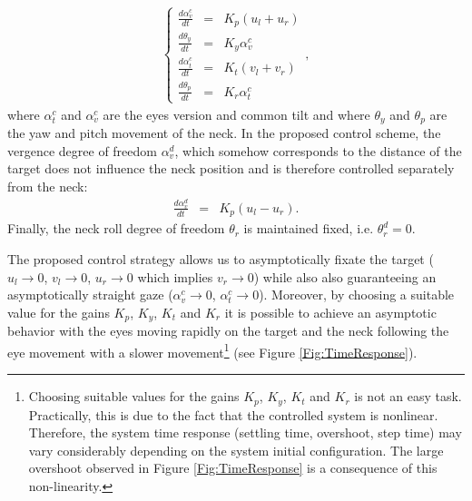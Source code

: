 \begin{eqnarray} \label{Eq:HeadEyeControl}
\left\{ \begin{matrix}
\frac{d \alpha_v^c}{ d t} &=&   K_p (u_l + u_r)\\
\frac{d \theta_y}{ d t} &=&   K_y \alpha_v^c \\
\frac{d \alpha_t^c} {d t} &=&   K_t (v_l + v_r)\\
\frac{d \theta_p} {d t} &=&   K_r \alpha_t^c
\end{matrix} \right.,
\end{eqnarray}
where $\alpha_t^c$ and $\alpha_v^c$ are the eyes version and common tilt and where $\theta_y$ and $\theta_p$ are the yaw and pitch movement of the neck. In the proposed control scheme, the vergence degree of freedom $\alpha_v^d$, which somehow corresponds to the distance of the target does not influence the neck position and is therefore controlled separately from the neck:
\begin{eqnarray} 
\frac{d \alpha_v^d}{ d t} &=&   K_p (u_l - u_r).
\end{eqnarray}
Finally, the neck roll degree of freedom $\theta_r$ is maintained fixed, i.e. $\theta_r^d=0$.

The proposed control strategy allows us to asymptotically fixate the target ($u_l \rightarrow 0$, $v_l \rightarrow 0$, $u_r \rightarrow 0$ which implies $v_r \rightarrow 0$) while also also guaranteeing an asymptotically  straight gaze ($\alpha_v^c \rightarrow 0$, $\alpha_t^c \rightarrow 0$). Moreover, by choosing a suitable value for the gains $K_p$, $K_y$, $K_t$ and $K_r$ it is possible to achieve an asymptotic behavior with the eyes moving rapidly on the target and the neck following the eye movement with a slower movement\footnote{\samepage Choosing suitable values for the gains $K_p$, $K_y$, $K_t$ and $K_r$ is not an easy task. Practically, this is due to the fact that the controlled system is nonlinear. Therefore, the system time response (settling time, overshoot, step time) may vary considerably depending on the system initial configuration. The large overshoot observed in Figure \ref{Fig:TimeResponse} is a consequence of this non-linearity.} (see Figure \ref{Fig:TimeResponse}).


